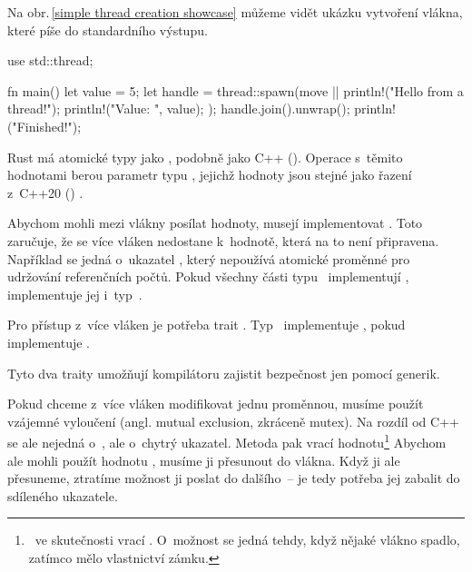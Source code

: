 \documentclass[main.tex]{subfiles}
\begin{document}
Na obr.\,\ref{simple thread creation showcase} můžeme vidět ukázku vytvoření vlákna, které
píše do standardního výstupu.

\obrazek
\begin{rustcode}
    use std::thread;

    fn main() {
        let value = 5;
        let handle = thread::spawn(move || {
            println!("Hello from a thread!");
            println!("Value: {}", value);
        });
        handle.join().unwrap();
        println!("Finished!");
    }
\end{rustcode}


Rust má atomické typy jako , podobně jako C++ ().
Operace s~těmito hodnotami berou parametr typu , jejichž hodnoty jsou
stejné jako řazení z~C++20 () \cite[sync/atomic]{ruststd}.


Abychom mohli mezi vlákny posílat hodnoty, musejí implementovat . Toto
zaručuje, že se více vláken nedostane k~hodnotě, která na to není připravena. Například se
jedná o~ukazatel , který nepoužívá atomické proměnné pro udržování
referenčních počtů. Pokud všechny části typu~ implementují ,
implementuje jej i~typ~. \cite[marker/trait.Send]{ruststd}

Pro přístup z~více vláken je potřeba trait . Typ~ implementuje
, pokud  implementuje .
\cite[marker/trait.Sync]{ruststd}

Tyto dva traity umožňují kompilátoru zajistit bezpečnost jen pomocí generik.


Pokud chceme z~více vláken modifikovat jednu proměnnou, musíme použít vzájemné vyloučení
(angl. mutual exclusion, zkráceně mutex). Na rozdíl od C++ se ale nejedná o~,
ale o~chytrý ukazatel. Metoda  pak vrací hodnotu\footnote{~ve skutečnosti
    vrací . O~možnost  se jedná tehdy, když nějaké vlákno spadlo,
    zatímco mělo vlastnictví zámku.
} Abychom ale mohli použít hodnotu , musíme ji přesunout do vlákna. Když
ji ale přesuneme, ztratíme možnost ji poslat do dalšího~-- je tedy potřeba jej zabalit
do sdíleného ukazatele.
\end{document}
